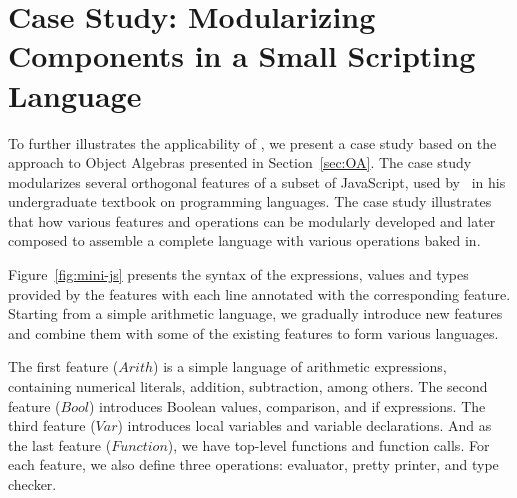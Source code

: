 \section{Case Study: Modularizing Components in a Small Scripting Language}

To further illustrates the applicability of \name, we present a case study based
on the approach to Object Algebras presented in Section~\ref{sec:OA}. The case
study modularizes several orthogonal features of a subset of JavaScript, used
by~\citet{poplcook} in his undergraduate textbook on programming languages. The
case study illustrates that how various features and operations can be modularly
developed and later composed to assemble a complete language with various
operations baked in.




Figure~\ref{fig:mini-js} presents the syntax of the expressions, values and
types provided by the features with each line annotated with the corresponding
feature. Starting from a simple arithmetic language, we gradually introduce new
features and combine them with some of the existing features to form various
languages.

The first feature ($\mathit{Arith}$) is a simple language of arithmetic
expressions, containing numerical literals, addition, subtraction, among others.
The second feature ($\mathit{Bool}$) introduces Boolean values, comparison, and
if expressions. The third feature ($\mathit{Var}$) introduces local variables
and variable declarations. And as the last feature ($\mathit{Function}$), we
have top-level functions and function calls. For each feature, we also define
three operations: evaluator, pretty printer, and type checker.

